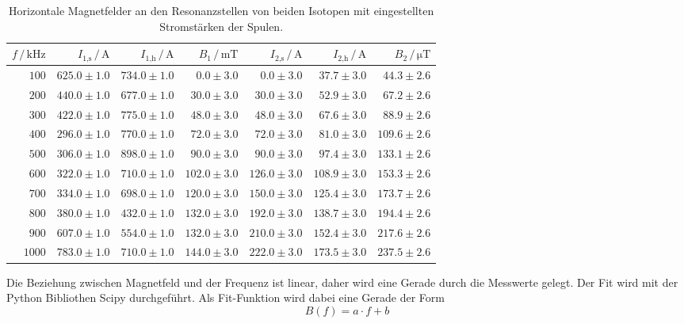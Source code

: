 \begin{table}
    \centering
    \caption{Horizontale Magnetfelder an den Resonanzstellen von beiden Isotopen mit eingestellten Stromstärken der Spulen.}
    \label{tab:f}
    \begin{tabular}{r r r r r r r}
        \toprule
        $f \,/\, \unit{\kilo\hertz}$ & $I_\text{1,s} \,/\, \unit{\ampere}$ & $I_\text{1,h} \,/\, \unit{\ampere}$ & $B_\text{1} \,/\, \unit{\milli\tesla}$ & $I_\text{2,s} \,/\, \unit{\ampere}$ & $I_\text{2,h} \,/\, \unit{\ampere}$ & $B_\text{2} \,/\, \unit{\micro\tesla}$\\
        \midrule
        $100 $ & $625.0\pm1.0$ & $734.0\pm1.0$ & $0.0\pm3.0$ & $0.0\pm3.0$  &     $37.7\pm3.0$ & $44.3\pm2.6$ \\
        $200 $ & $440.0\pm1.0$ & $677.0\pm1.0$ & $30.0\pm3.0$ & $30.0\pm3.0$    & $52.9\pm3.0$ & $67.2\pm2.6$ \\
        $300 $ & $422.0\pm1.0$ & $775.0\pm1.0$ & $48.0\pm3.0$ & $48.0\pm3.0$    & $67.6\pm3.0$ & $88.9\pm2.6$ \\
        $400 $ & $296.0\pm1.0$ & $770.0\pm1.0$ & $72.0\pm3.0$  & $72.0\pm3.0 $  & $81.0\pm3.0$ & $109.6\pm2.6$ \\
        $500 $ & $306.0\pm1.0$ & $898.0\pm1.0$ & $90.0\pm3.0$  & $90.0\pm3.0 $  & $97.4\pm3.0$ & $133.1\pm2.6$ \\
        $600 $ & $322.0\pm1.0$ & $710.0\pm1.0$ & $102.0\pm3.0$ & $126.0\pm3.0$ & $108.9\pm3.0$ & $153.3\pm2.6$ \\
        $700 $ & $334.0\pm1.0$ & $698.0\pm1.0$ & $120.0\pm3.0$ & $150.0\pm3.0$ & $125.4\pm3.0$ & $173.7\pm2.6$ \\
        $800 $ & $380.0\pm1.0$ & $432.0\pm1.0$ & $132.0\pm3.0$ & $192.0\pm3.0$ & $138.7\pm3.0$ & $194.4\pm2.6$ \\
        $900 $ & $607.0\pm1.0$ & $554.0\pm1.0$ & $132.0\pm3.0$ & $210.0\pm3.0$ & $152.4\pm3.0$ & $217.6\pm2.6$ \\
        $1000$ & $783.0\pm1.0$ & $710.0\pm1.0$ & $144.0\pm3.0$ & $222.0\pm3.0$ & $173.5\pm3.0$ & $237.5\pm2.6$ \\
        \bottomrule
    \end{tabular}
\end{table}
Die Beziehung zwischen Magnetfeld und der Frequenz ist linear, daher wird eine Gerade durch die Messwerte gelegt.
Der Fit wird mit der Python Bibliothen Scipy \cite{scipy} durchgeführt.
Als Fit-Funktion wird dabei eine Gerade der Form
\begin{equation*}
    B(f) = a \cdot f + b
\end{equation*}
